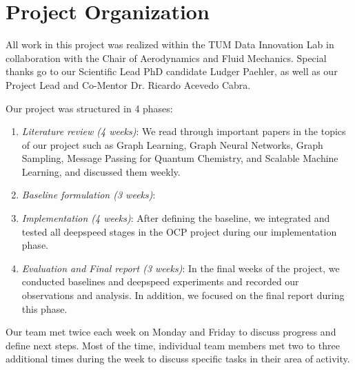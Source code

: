 \section*{Project Organization}

All work in this project was realized within the TUM Data Innovation Lab in collaboration with the Chair of 
Aerodynamics and Fluid Mechanics. Special thanks go to our Scientific Lead PhD candidate Ludger Paehler, 
as well as our Project Lead and Co-Mentor Dr. Ricardo Acevedo Cabra.

Our project was structured in 4 phases:

\begin{enumerate}
    \item \textit{Literature review (4 weeks)}: We read through important papers in the topics of our project such 
    as Graph Learning, Graph Neural Networks, Graph Sampling, Message Passing for Quantum Chemistry, 
    and Scalable Machine Learning, and discussed them weekly.
    \item \textit{Baseline formulation (3 weeks)}: 
    \item \textit{Implementation (4 weeks)}: After defining the baseline, we integrated and tested all deepspeed 
    stages in the OCP project during our implementation phase.
    \item \textit{Evaluation and Final report (3 weeks)}: In the final weeks of the project, we conducted baselines 
    and deepspeed experiments and recorded our observations and analysis. In addition, we focused on the final 
    report during this phase.
\end{enumerate}

Our team met twice each week on Monday and Friday to discuss progress and define next steps. Most of 
the time, individual team members met two to three additional times during the week to discuss specific 
tasks in their area of activity. 